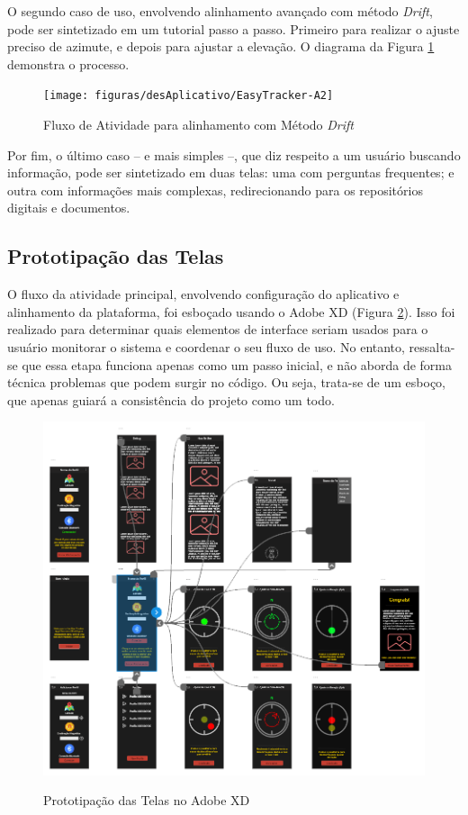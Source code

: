 \label{sec:driftproj}
O segundo caso de uso, envolvendo alinhamento avançado com método \textit{Drift}, pode ser sintetizado em um tutorial passo a passo. Primeiro para realizar o ajuste preciso de azimute, e depois para ajustar a elevação. O diagrama da Figura \ref{fig:atividadedrif} demonstra o processo.

\begin{figure}[!htb]
	\centering
	\caption{Fluxo de Atividade para alinhamento com Método \textit{Drift}}
	\texttt{[image: figuras/desAplicativo/EasyTracker-A2]}
	\label{fig:atividadedrif}
\end{figure}

Por fim, o último caso -- e mais simples --, que diz respeito a um usuário buscando informação, pode ser sintetizado em duas telas: uma com perguntas frequentes; e outra com informações mais complexas, redirecionando para os repositórios digitais e documentos. 

\subsection{Prototipação das Telas}
\label{sec:prototipacao}
O fluxo da atividade principal, envolvendo configuração do aplicativo e alinhamento da plataforma, foi esboçado usando o Adobe XD (Figura \ref{fig:adobexd}). Isso foi realizado para determinar quais elementos de interface seriam usados para o usuário monitorar o sistema e coordenar o seu fluxo de uso. No entanto, ressalta-se que essa etapa funciona apenas como um passo inicial, e não aborda de forma técnica problemas que podem surgir no código. Ou seja, trata-se de um esboço, que apenas guiará a consistência do projeto como um todo.

\begin{figure}[!htb]
	\centering
	\caption{Prototipação das Telas no Adobe XD}
	\includegraphics[width=0.7\linewidth]{figuras/desAplicativo/adobexd}
	\label{fig:adobexd}
\end{figure}


